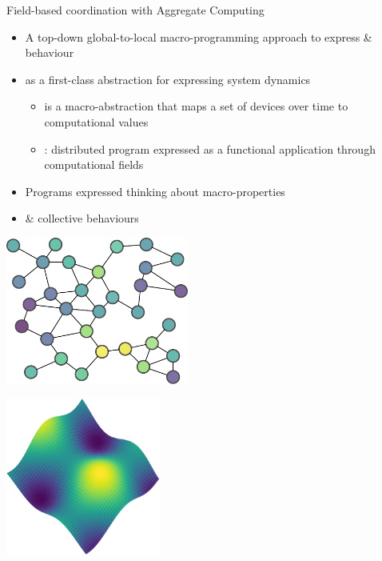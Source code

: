 \documentclass[8pt, aspectratio=169, handout]{beamer}
\begin{document}
\begin{frame}{Field-based coordination with Aggregate Computing}
  \begin{cardTiny}
    \begin{itemize}
      \item <1-> A top-down global-to-local macro-programming approach to express  \&  behaviour~\cite{DBLP:conf/saso/BealVPD16}
      \item <2->  as a first-class abstraction for expressing system dynamics
      \begin{itemize}
        \item is a macro-abstraction that maps a set of devices over time to computational values
        \item [\success{\faThumbsUp}] : distributed program expressed as a functional application through computational fields
      \end{itemize}
    \end{itemize}
  \end{cardTiny}
  \begin{multicols}{2}
    \begin{card}[Benefits]
      \begin{itemize}
        \item Programs expressed thinking about macro-properties
        \item {} \&  collective behaviours
      \end{itemize}
    \end{card}
    \begin{cardTiny}
      \includegraphics[width=0.45\textwidth]{img/discrete.pdf}
      \hfill
      \parbox[c]{1em}{\color{primary}\vspace*{-6em}\Large \faArrowRight}
      \hfill
      \includegraphics[width=0.38\textwidth]{img/viridis-result.png}
    \end{cardTiny}
  \end{multicols}
\end{frame}
\end{document}
